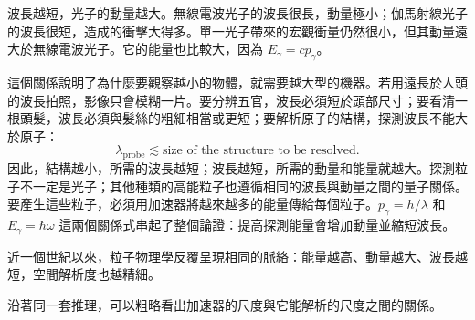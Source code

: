 \begin{classroomqa}
\end{classroomqa}

波長越短，光子的動量越大。無線電波光子的波長很長，動量極小；伽馬射線光子的波長很短，造成的衝擊大得多。單一光子帶來的宏觀衝量仍然很小，但其動量遠大於無線電波光子。它的能量也比較大，因為 \(E_\gamma=cp_\gamma\)。

這個關係說明了為什麼要觀察越小的物體，就需要越大型的機器。若用遠長於人頭的波長拍照，影像只會模糊一片。要分辨五官，波長必須短於頭部尺寸；要看清一根頭髮，波長必須與髮絲的粗細相當或更短；要解析原子的結構，探測波長不能大於原子：
\begin{equation}
\lambda_{\mathrm{probe}}\lesssim
\text{size of the structure to be resolved}.
\end{equation}
因此，結構越小，所需的波長越短；波長越短，所需的動量和能量就越大。探測粒子不一定是光子；其他種類的高能粒子也遵循相同的波長與動量之間的量子關係。要產生這些粒子，必須用加速器將越來越多的能量傳給每個粒子。\(p_\gamma=h/\lambda\) 和 \(E_\gamma=\hbar\omega\) 這兩個關係式串起了整個論證：提高探測能量會增加動量並縮短波長。

近一個世紀以來，粒子物理學反覆呈現相同的脈絡：能量越高、動量越大、波長越短，空間解析度也越精細。

\begin{classroomqa}
\end{classroomqa}

沿著同一套推理，可以粗略看出加速器的尺度與它能解析的尺度之間的關係。

\begin{classroomqa}
\end{classroomqa}

